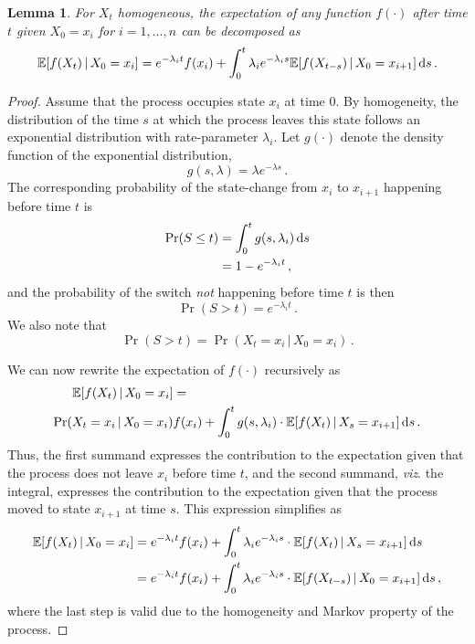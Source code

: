 \documentclass[10pt]{article}
\newtheorem{lemma}[theorem]{Lemma}
\newcommand{\dx}[1][x]{\text{\,d}#1}
\begin{document}
\begin{lemma}
For $X_t$ homogeneous, the expectation of any function $f(\cdot)$ after time $t$ given $X_0=x_i$ for $i=1,\ldots,n$ can be decomposed as
\begin{equation*}
\mathbb{E}[f(X_t)\,\vert\,X_0=x_i] = e^{-\lambda_i t}f(x_i) + \int_0^t \lambda_i e^{-\lambda_i s} \mathbb{E}[f(X_{t-s})\,\vert\,X_0=x_{i+1}]\dx[s]\,.
\end{equation*}
\end{lemma}
\begin{proof}
Assume that the process occupies state $x_i$ at time $0$. By homogeneity, the distribution of the time $s$ at which the process leaves this state follows an exponential distribution with rate-parameter $\lambda_i$. Let $g(\cdot)$ denote the density function of the exponential distribution,
\begin{equation*}
g(s,\lambda) = \lambda e^{-\lambda s}\,.
\end{equation*}
The corresponding probability of the state-change from $x_i$ to $x_{i+1}$ happening before time $t$ is
\begin{align*}
\Pr(S \leq t) &= \int_0^t g(s,\lambda_i)\dx[s] \\
 &= 1 - e^{-\lambda_i t}\,,
\end{align*}
and the probability of the switch \emph{not} happening before time $t$ is then
\begin{equation*}
\Pr(S > t) = e^{-\lambda_i t}\,.
\end{equation*}
We also note that
\begin{equation*}
\Pr(S > t) = \Pr(X_t=x_i\,\vert\,X_0=x_i)\,.
\end{equation*}

We can now rewrite the expectation of $f(\cdot)$ recursively as
\begin{align*}
\mathbb{E}[f(X_t)\,\vert\,X_0=x_i] &= \\
\Pr(X_t=x_i\,\vert\,X_0=x_i)&f(x_i) + \int_0^t g(s,\lambda_i)\cdot\mathbb{E}[f(X_t)\,\vert\,X_s=x_{i+1}]\dx[s]\,.
\end{align*}
Thus, the first summand expresses the contribution to the expectation given that the process does not leave $x_i$ before time $t$, and the second summand, \emph{viz}. the integral, expresses the contribution to the expectation given that the process moved to state $x_{i+1}$ at time $s$. This expression simplifies as
\begin{align*}
\mathbb{E}[f(X_t)\,\vert\,X_0=x_i] = e^{-\lambda_i t}&f(x_i) + \int_0^t \lambda_i e^{-\lambda_i s}\cdot\mathbb{E}[f(X_t)\,\vert\,X_s=x_{i+1}]\dx[s]\\
 = e^{-\lambda_i t}&f(x_i) + \int_0^t \lambda_i e^{-\lambda_i s}\cdot\mathbb{E}[f(X_{t-s})\,\vert\,X_0=x_{i+1}]\dx[s]\,,
\end{align*}
where the last step is valid due to the homogeneity and Markov property of the process.
\end{proof}
\end{document}
